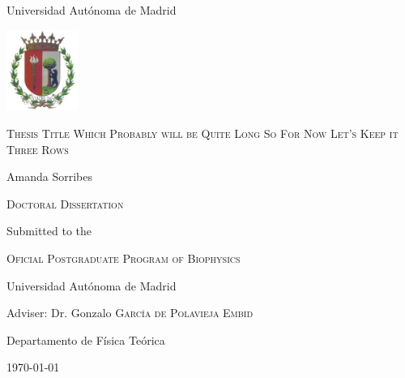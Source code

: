 \begin{titlepage}

\begin{center}

{\large Universidad Autónoma de Madrid}
\vspace{0.3cm}

\includegraphics[width=0.175\textwidth]{Frontmatter/Escudo_UAM}
\vspace{2.2cm}

\fontsize{30}{24}\selectfont
\textsc{ \huge Thesis Title Which Probably will be Quite Long So For Now Let's Keep it Three Rows}
\vspace{2.0cm}

\fontsize{11}{13}\selectfont
{\LARGE  Amanda Sorribes}
\vspace{3.6cm}

{\large \textsc{Doctoral Dissertation}}
\vspace{0.16cm}

{\large Submitted to the}
\vspace{0.16cm}

\textsc{\large Oficial Postgraduate Program of Biophysics}%
\vspace{0.16cm}

{\large Universidad Autónoma de Madrid}
\vspace{0.65cm}


{\large Adviser: Dr. Gonzalo \textsc{García de Polavieja Embid}}
\vspace{0.15cm}

{\large Departamento de Física Teórica}

\vfill

{\normalsize \today}

\end{center}
\restoregeometry
\end{titlepage}









